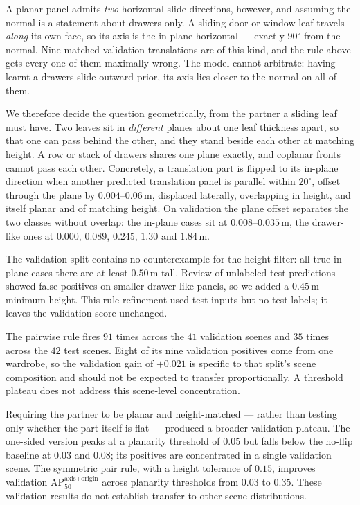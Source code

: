\documentclass[11pt]{article}
\newcommand{\metric}{AP$_{50}^{\text{axis+origin}}$}
\begin{document}
A planar panel admits \emph{two} horizontal slide directions, however, and
assuming the normal is a statement about drawers only. A sliding door or
window leaf travels \emph{along} its own face, so its axis is the in-plane
horizontal --- exactly $90^\circ$ from the normal. Nine matched validation
translations are of this kind, and the rule above gets every one of them
maximally wrong. The model cannot arbitrate: having learnt a
drawers-slide-outward prior, its axis lies closer to the normal on all of
them.

We therefore decide the question geometrically, from the partner a sliding
leaf must have. Two leaves sit in \emph{different} planes about one leaf
thickness apart, so that one can pass behind the other, and they stand
beside each other at matching height. A row or stack of drawers shares one
plane exactly, and coplanar fronts cannot pass each other. Concretely, a
translation part is flipped to its in-plane direction when another predicted
translation panel is parallel within $20^\circ$, offset through the plane by
$0.004$--$0.06$\,m, displaced laterally, overlapping in height, and itself
planar and of matching height. On validation the plane offset separates the
two classes without overlap: the in-plane cases sit at $0.008$--$0.035$\,m,
the drawer-like ones at $0.000$, $0.089$, $0.245$, $1.30$ and $1.84$\,m.

The validation split contains no counterexample for the height filter:
all true in-plane cases there are at least $0.50$\,m tall. Review of
unlabeled test predictions showed false positives on smaller drawer-like
panels, so we added a $0.45$\,m minimum height. This rule refinement used
test inputs but no test labels; it leaves the validation score unchanged.

The pairwise rule fires $91$ times across the $41$ validation scenes and
$35$ times across the $42$ test scenes. Eight of its nine validation
positives come from one wardrobe, so the validation gain of $+0.021$ is
specific to that split's scene composition and should not be expected to
transfer proportionally. A threshold plateau does not address this
scene-level concentration.

Requiring the partner to be planar and height-matched --- rather than testing
only whether the part itself is flat --- produced a broader validation
plateau. The one-sided version peaks at a planarity threshold of $0.05$ but
falls below the no-flip baseline at $0.03$ and $0.08$; its positives are
concentrated in a single validation scene. The symmetric pair rule, with a
height tolerance of $0.15$, improves validation \metric{} across planarity
thresholds from $0.03$ to $0.35$. These validation results do not establish
transfer to other scene distributions.
\end{document}
